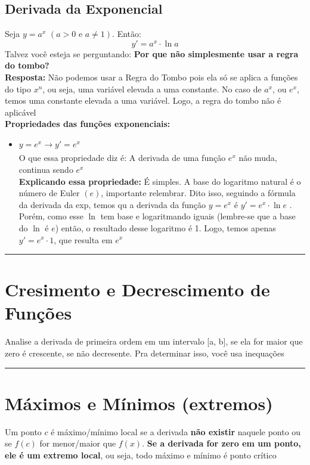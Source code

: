 \documentclass{article}
\begin{document}
\subsection{Derivada da Exponencial}
Seja \( y = a^x \) \((a > 0 \text{ e } a \neq 1)\). Então:
\[
y' = a^x \cdot \ln a
\]
Talvez você esteja se perguntando: \textbf{Por que não simplesmente usar a regra do tombo?}
\\[5pt]
\textbf{Resposta:} Não podemos usar a Regra do Tombo pois ela só se aplica a funções do tipo $x^{n}$, ou seja, uma variável elevada a uma constante. No caso de $a^{x}$, ou $e^{x}$, temos uma constante elevada a uma variável. Logo, a regra do tombo não é aplicável
\\[10pt]
\textbf{Propriedades das funções exponenciais:}
\begin{itemize}
    \item $y = e^{x} \xrightarrow[]{} y' = e^{x}$\\[10pt]
    O que essa propriedade diz é: A derivada de uma função $e^{x}$ não muda, continua sendo $e^{x}$\\[10pt]
    \textbf{Explicando essa propriedade:} É simples. A base do logaritmo natural é o número de Euler $(e)$, importante relembrar. Dito isso, seguindo a fórmula da derivada da exp, temos qu a derivada da função $y = e^{x}$ é $y' = e^x \cdot \ln e$ . Porém, como esse $\ln$ tem base e logaritmando iguais (lembre-se que a base do $\ln$ é $e$) então, o resultado desse logaritmo é 1. Logo, temos apenas $y' = e^x \cdot 1$, que resulta em $e^{x}$
\end{itemize}
\vspace{15pt}
\hrule

\section{Cresimento e Decrescimento de Funções}
Analise a derivada de primeira ordem em um intervalo [a, b], se ela for maior que zero é crescente, se não decresente. Pra determinar isso, você usa inequações
\vspace{15pt}
\hrule

\section{Máximos e Mínimos (extremos)}
Um ponto $c$ é máximo/mínimo local se a derivada \textbf{não existir} naquele ponto ou se $f(c)$ for menor/maior que $f(x)$. \textbf{Se a derivada for zero em um ponto, ele é um extremo local}, ou seja, todo máximo e mínimo é ponto crítico
\end{document}
